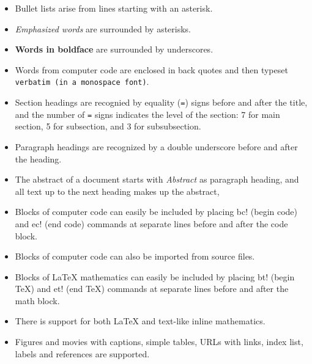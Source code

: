 \documentclass[twoside]{article}
\begin{document}
\begin{itemize}
  \item Bullet lists arise from lines starting with an asterisk.

  \item \emph{Emphasized words} are surrounded by asterisks.

  \item \textbf{Words in boldface} are surrounded by underscores.

  \item Words from computer code are enclosed in back quotes and
    then typeset {\fontsize{10pt}{10pt}\verb!verbatim (in a monospace font)!}.

  \item Section headings are recognied by equality ({\fontsize{10pt}{10pt}\verb!=!}) signs before
    and after the title, and the number of {\fontsize{10pt}{10pt}\verb!=!} signs indicates the
    level of the section: 7 for main section, 5 for subsection, and
    3 for subsubsection.

  \item Paragraph headings are recognized by a double underscore
    before and after the heading.

  \item The abstract of a document starts with \emph{Abstract} as paragraph
    heading, and all text up to the next heading makes up the abstract,

  \item Blocks of computer code can easily be included by placing
    {\fontsize{10pt}{10pt}\verb!!bc!} (begin code) and {\fontsize{10pt}{10pt}\verb!!ec!} (end code) commands at separate lines
    before and after the code block.

  \item Blocks of computer code can also be imported from source files.

  \item Blocks of {\LaTeX} mathematics can easily be included by placing
    {\fontsize{10pt}{10pt}\verb!!bt!} (begin TeX) and {\fontsize{10pt}{10pt}\verb!!et!} (end TeX) commands at separate lines
    before and after the math block.

  \item There is support for both {\LaTeX} and text-like inline mathematics.

  \item Figures and movies with captions, simple tables,
    URLs with links, index list, labels and references are supported.


\end{itemize}
\end{document}
